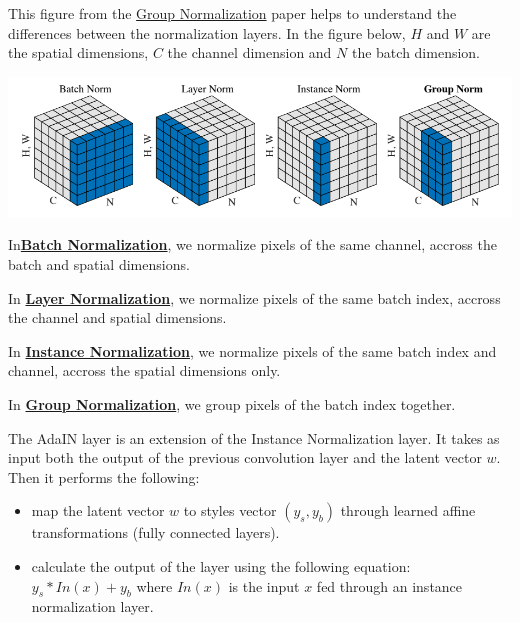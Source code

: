 This figure from the \href{https://arxiv.org/pdf/1803.08494.pdf}{Group
Normalization} paper helps to understand the differences between the
normalization layers. In the figure below, \(H\) and \(W\) are the
spatial dimensions, \(C\) the channel dimension and \(N\) the batch
dimension.

\includegraphics[width=1\linewidth]{img//genAdvNet//modernGAN/normalization_layers.png}

In\href{https://pytorch.org/docs/stable/generated/torch.nn.BatchNorm2d.html}{\textbf{Batch Normalization}}, we normalize pixels of the same channel, accross the batch and spatial dimensions. \newline

In \href{https://pytorch.org/docs/stable/generated/torch.nn.LayerNorm.html}{\textbf{Layer Normalization}}, we normalize pixels of the same batch index, accross the channel and spatial dimensions. \newline

In \href{https://pytorch.org/docs/stable/generated/torch.nn.InstanceNorm2d.html}{\textbf{Instance Normalization}}, we normalize pixels of the same batch index and channel, accross the spatial dimensions only. \newline

In \href{https://pytorch.org/docs/stable/generated/torch.nn.GroupNorm.html}{\textbf{Group Normalization}}, we group pixels of the batch index together. \newline

The AdaIN layer is an extension of the Instance Normalization layer. It
takes as input both the output of the previous convolution layer and the
latent vector \(w\). Then it performs the following: 
\begin{itemize}
    \item map the latent vector \(w\) to styles vector \((y_{s}, y_{b})\) through learned affine transformations (fully connected layers).
    \item calculate the output of the layer using the following equation: \(y_{s} * In(x) + y_{b}\) where \(In(x)\) is the input \(x\) fed through an instance normalization layer.
\end{itemize}

